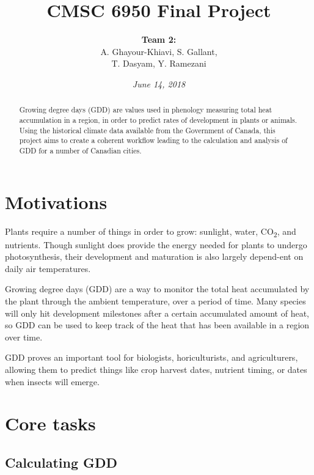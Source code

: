 \documentclass[12pt]{article}
\title{CMSC 6950 Final Project}
\author{
        \textbf{Team 2:}\\
        A. Ghayour-Khiavi, S. Gallant,\\
        T. Dasyam, Y. Ramezani \\
        \and
}
\date{\textit{June 14, 2018}}
\begin{document}
\maketitle

\begin{abstract}
Growing degree days (GDD) are values used in phenology measuring total heat accumulation in a region, in order to predict rates of development in  plants or animals. Using the historical climate data available from the Government of Canada, this project aims to create a coherent workflow leading to the calculation and analysis of GDD for a number of Canadian cities.  
\end{abstract}

\smallskip

\tableofcontents


\pagebreak

\section{Motivations}\label{motivations}

Plants require a number of things in order to grow: sunlight, 
water, CO\textsubscript{2}, and nutrients. Though sunlight does provide the energy 
needed for plants to undergo photosynthesis, their development and maturation 
is also largely depend-ent on daily air temperatures.

\bigskip
\par 
Growing degree days (GDD) are a way to monitor the total heat 
accumulated by the plant through the ambient temperature, over a 
period of time. Many species will only hit development milestones 
after a certain accumulated amount of heat, so GDD can be used to 
keep track of the heat that has been available in a region over time. 

\bigskip
\par 
GDD proves an important tool for biologists, horiculturists, and agriculturers, 
allowing them to predict things like crop harvest dates, 
nutrient timing, or dates when insects will emerge.    

\pagebreak


\section{Core tasks}\label{core tasks}
\subsection{Calculating GDD}\label{calculating gdd}
\end{document}

